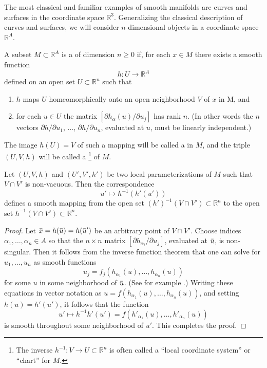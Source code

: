 \documentclass[../main]{subfiles}
\begin{document}
The most classical and familiar examples of smooth manifolds are curves and surfaces in the coordinate space ${\mathbb R}^3$. Generalizing the classical description of curves and surfaces, we will consider $n$-dimensional objects in a coordinate space ${\mathbb R}^A$. 

\begin{definition}
A subset $M \subset {\mathbb R}^A$ is a  of dimension $n \ge 0$ if, for each $x \in M$ there exists a smooth function \[h : U \longrightarrow {\mathbb R}^A\] defined on an open set $U \subset {\mathbb R}^n$ such that

\begin{enumerate}[label=\arabic*)]
    \item $h$ maps $U$ homeomorphically onto an open neighborhood $V$ of $x$ in M, and
    \item for each $u \in U$ the matrix $[\partial h_\alpha(u)/\partial u_j]$ has rank $n$. (In other words the $n$ vectors $\partial h/\partial u_1$, $\ldots$, $\partial h/\partial u_n$, evaluated at $u$, must be linearly independent.) 
\end{enumerate}

The image $h(U) = V$ of such a mapping will be called a  in $M$, and the triple $(U, V, h)$ will be called a \footnote{The inverse $h^{-1} : V \longrightarrow U \subset {\mathbb R}^n$ is often called a ``local coordinate system'' or ``chart'' for $M$.} of $M$. 
\end{definition}

\begin{lemma}
\label{lem:1.1}
Let $(U, V, h)$ and $(U', V', h')$ be two local parameterizations of $M$ such that $V \cap V'$ is non-vacuous. Then the correspondence \[u' \mapsto h^{-1}(h'(u'))\] defines a smooth mapping from the open set $(h')^{-1}(V \cap V') \subset {\mathbb R}^n$ to the open set $h^{-1}(V \cap V') \subset {\mathbb R}^n$. 
\end{lemma}

\begin{proof}
Let $\xoverline x = h(\xoverline u) = h(\xoverline u')$ be an arbitrary point of $V \cap V'$. Choose indices $\alpha_1, \ldots, \alpha_n \in A$ so that the $n \times n$ matrix $[\partial h_{\alpha_i}/\partial u_j]$, evaluated at $\xoverline u$, is non-singular. Then it follows from the inverse function theorem that one can solve for $u_1, \ldots, u_n$ as smooth functions \[u_j = f_j(h_{\alpha_1}(u), \ldots, h_{\alpha_n}(u))\] for some $u$ in some neighborhood of $\xoverline u$. (See for example \cite[p.69]{whitney1957}.) Writing these equations in vector notation as $u = f(h_{\alpha_1}(u), \ldots, h_{\alpha_n}(u))$, and setting $h(u) = h'(u')$, it follows that the function \[u' \mapsto h^{-1}h'(u') = f(h'_{\alpha_1}(u), \ldots, h'_{\alpha_n}(u))\] is smooth throughout some neighborhood of $u'$. This completes the proof. 
\end{proof}
\end{document}
